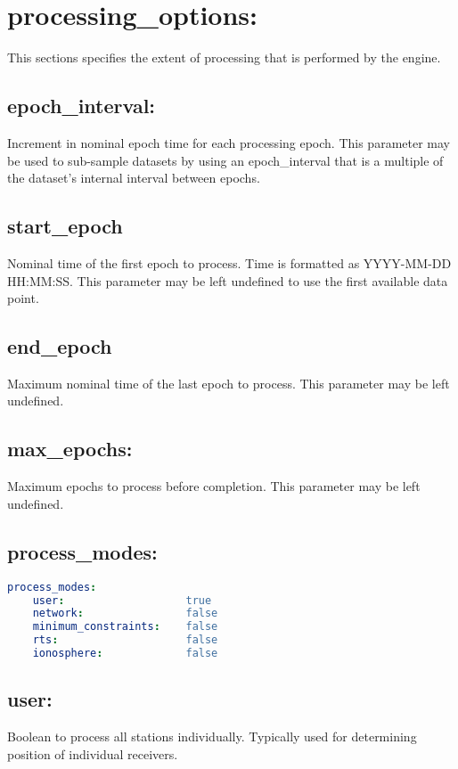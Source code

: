 \section{processing\_options:}

This sections specifies the extent of processing that is performed by the engine.

\subsection*{epoch\_interval:}
Increment in nominal epoch time for each processing epoch. This parameter may be used to sub-sample datasets by using an epoch\_interval that is a multiple of the dataset's internal interval between epochs.

\subsection*{start\_epoch}
Nominal time of the first epoch to process. Time is formatted as YYYY-MM-DD HH:MM:SS.
This parameter may be left undefined to use the first available data point.

\subsection*{end\_epoch}
Maximum nominal time of the last epoch to process. This parameter may be left undefined.

\subsection*{max\_epochs:}
Maximum epochs to process before completion. This parameter may be left undefined.

\subsection*{process\_modes:}

\begin{lstlisting}[language=yaml,caption=process\_modes:]
process_modes:
    user:                   true
    network:                false
    minimum_constraints:    false
    rts:                    false
    ionosphere:             false
\end{lstlisting}

\subsection*{user:}
Boolean to process all stations individually. Typically used for determining position of individual receivers.


